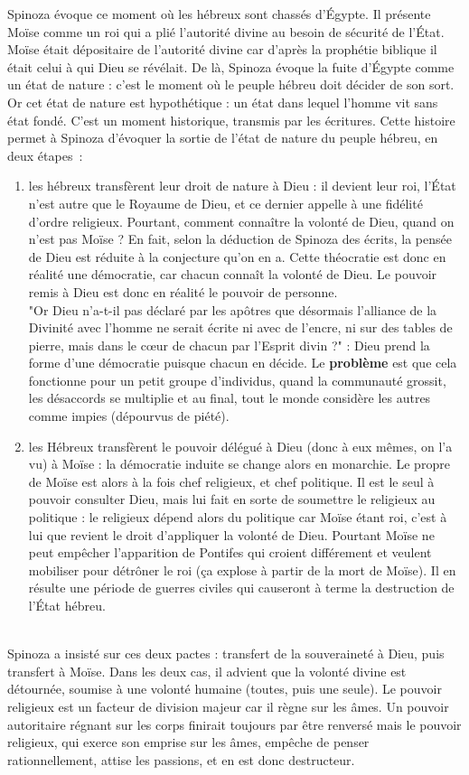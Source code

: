 \documentclass[a4paper,12pt]{article}
\begin{document}
Spinoza évoque ce moment où les hébreux sont chassés d'Égypte. Il présente Moïse comme un roi qui a plié l'autorité divine au besoin de sécurité de l'État. Moïse était dépositaire de l'autorité divine car d'après la prophétie biblique il était celui à qui Dieu se révélait. De là, Spinoza évoque la fuite d'Égypte comme un état de nature : c'est le moment où le peuple hébreu doit décider de son sort. Or cet état de nature est hypothétique : un état dans lequel l'homme vit sans état fondé. C'est un moment historique, transmis par les écritures. Cette histoire permet à Spinoza d'évoquer la sortie de l'état de nature du peuple hébreu, en deux étapes~:
\begin{enumerate}
    \item les hébreux transfèrent leur droit de nature à Dieu : il devient leur roi, l'État n'est autre que le Royaume de Dieu, et ce dernier appelle à une fidélité d'ordre religieux. Pourtant, comment connaître la volonté de Dieu, quand on n'est pas Moïse ? En fait, selon la déduction de Spinoza des écrits, la pensée de Dieu est réduite à la conjecture qu'on en a. Cette théocratie est donc en réalité une démocratie, car chacun connaît la volonté de Dieu. Le pouvoir remis à Dieu est donc en réalité le pouvoir de personne.\\
    "Or Dieu n’a-t-il pas déclaré par les apôtres que désormais l’alliance de la Divinité avec l’homme ne serait écrite ni avec de l’encre, ni sur des tables de pierre, mais dans le cœur de chacun par l’Esprit divin ?" : Dieu prend la forme d'une démocratie puisque chacun en décide. Le \textbf{problème} est que cela fonctionne pour un petit groupe d'individus, quand la communauté grossit, les désaccords se multiplie et au final, tout le monde considère les autres comme impies (dépourvus de piété).
    \item les Hébreux transfèrent le pouvoir délégué à Dieu (donc à eux mêmes, on l'a vu) à Moïse : la démocratie induite se change alors en monarchie. Le propre de Moïse est alors à la fois chef religieux, et chef politique. Il est le seul à pouvoir consulter Dieu, mais lui fait en sorte de soumettre le religieux au politique : le religieux dépend alors du politique car Moïse étant roi, c'est à lui que revient le droit d'appliquer la volonté de Dieu. Pourtant Moïse ne peut empêcher l'apparition de Pontifes qui croient différement et veulent mobiliser pour détrôner le roi (ça explose à partir de la mort de Moïse). Il en résulte une période de guerres civiles qui causeront à terme la destruction de l'État hébreu.

\end{enumerate}

\\Spinoza a insisté sur ces deux pactes : transfert de la souveraineté à Dieu, puis transfert à Moïse. Dans les deux cas, il advient que la volonté divine est détournée, soumise à une volonté humaine (toutes, puis une seule). Le pouvoir religieux est un facteur de division majeur car il règne sur les âmes. Un pouvoir autoritaire régnant sur les corps finirait toujours par être renversé mais le pouvoir religieux, qui exerce son emprise sur les âmes, empêche de penser rationnellement, attise les passions, et en est donc destructeur.
\end{document}

